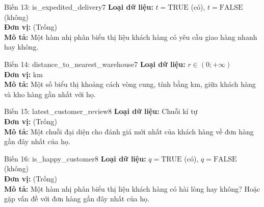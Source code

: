\noindent
\begin{minipage}[t]{0.48\textwidth}
\begin{mainbox}{Biến 13: is\_expedited\_delivery}{7}
    \textbf{Loại dữ liệu:} \(t = \text{TRUE}\) (có), \(t = \text{FALSE}\) (không) \\
    \textbf{Đơn vị:} (Trống) \\
    \textbf{Mô tả:} Một hàm nhị phân biểu thị liệu khách hàng có yêu cầu giao hàng nhanh hay không.
\end{mainbox}
\end{minipage}
\hfill
\begin{minipage}[t]{0.48\textwidth}
\begin{mainbox}{Biến 14: distance\_to\_nearest\_warehouse}{7}
    \textbf{Loại dữ liệu:} \(r \in (0; +\infty)\) \\
    \textbf{Đơn vị:} km \\
    \textbf{Mô tả:} Một số biểu thị khoảng cách vòng cung, tính bằng km, giữa khách hàng và kho hàng gần nhất với họ.
\end{mainbox}
\end{minipage}

\vspace{0.5cm}

\noindent
\begin{minipage}[t]{0.48\textwidth}
\begin{mainbox}{Biến 15: latest\_customer\_review}{8}
    \textbf{Loại dữ liệu:} Chuỗi kí tự \\
    \textbf{Đơn vị:} (Trống) \\
    \textbf{Mô tả:} Một chuỗi đại diện cho đánh giá mới nhất của khách hàng về đơn hàng gần đây nhất của họ.
\end{mainbox}
\end{minipage}
\hfill
\begin{minipage}[t]{0.48\textwidth}
\begin{mainbox}{Biến 16: is\_happy\_customer}{8}
    \textbf{Loại dữ liệu:} \(q = \text{TRUE}\) (có), \(q = \text{FALSE}\) (không) \\
    \textbf{Đơn vị:} (Trống) \\
    \textbf{Mô tả:} Một hàm nhị phân biểu thị liệu khách hàng có hài lòng hay không? Hoặc gặp vấn đề với đơn hàng gần đây nhất của họ.
\end{mainbox}
\end{minipage}